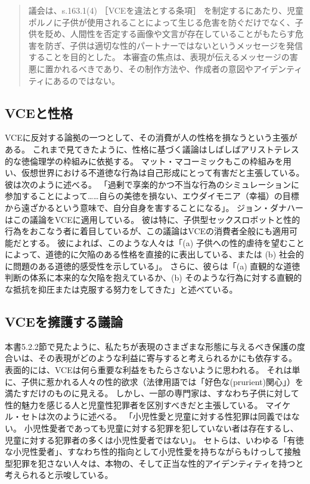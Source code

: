 \documentclass[paper=a4,book,openany]{jlreq} \usepackage{mystyle}
\begin{document}
\begin{quote}
議会は、s.163.1(4) ［VCEを違法とする条項］ を制定するにあたり、児童ポルノに子供が使用されることによって生じる危害を防ぐだけでなく、子供を貶め、人間性を否定する画像や文言が存在していることがもたらす危害を防ぎ、子供は適切な性的パートナーではないというメッセージを発信することを目的とした。
本審査の焦点は、表現が伝えるメッセージの害悪に置かれるべきであり、その制作方法や、作成者の意図やアイデンティティにあるのではない。
\end{quote}

\subsection{VCEと性格}

VCEに反対する論拠の一つとして、その消費が人の性格を損なうという主張がある。
これまで見てきたように、性格に基づく議論はしばしばアリストテレス的な徳倫理学の枠組みに依拠する。
マット・マコーミックもこの枠組みを用い、仮想世界における不道徳な行為は自己形成にとって有害だと主張している。
彼は次のように述べる。
「過剰で享楽的かつ不当な行為のシミュレーションに参加することによって……自らの美徳を損ない、エウダイモニア（幸福）の目標から遠ざかるという意味で、自分自身を害することになる」\citep[p.278]{mccormick01:_is_it_wrong_play_violen_video_games}。
ジョン・ダナハーはこの議論をVCEに適用している。
彼は特に、子供型セックスロボットと性的行為をおこなう者に着目しているが、この議論はVCEの消費者全般にも適用可能だとする。
彼によれば、このような人々は「(a) 子供への性的虐待を望むことによって、道徳的に欠陥のある性格を直接的に表出している、または (b) 社会的に問題のある道徳的感受性を示している」。
さらに、彼らは「(a) 直観的な道徳判断の体系に本来的な欠陥を抱えているか、(b) そのような行為に対する直観的な抵抗を抑圧または克服する努力をしてきた」と述べている\citep[p.86]{danaher17:_robot_rape_robot_child_sexual_abuse}。

\subsection{VCEを擁護する議論}

本書5.2.2節で見たように、私たちが表現のさまざまな形態に与えるべき保護の度合いは、その表現がどのような利益に寄与すると考えられるかにも依存する。
表面的には、VCEは何ら重要な利益をもたらさないように思われる。
それは単に、子供に惹かれる人々の性的欲求（法律用語では「好色な(prurient)関心」）を満たすだけのものに見える。
しかし、一部の専門家は、すなわち子供に対して性的魅力を感じる人{\DDASH}と児童性犯罪者を区別すべきだと主張している。
マイケル・セトは次のように述べる。
「小児性愛と児童に対する性犯罪は同義ではない。
小児性愛者であっても児童に対する犯罪を犯していない者は存在するし、児童に対する犯罪者の多くは小児性愛者ではない」\citep{apabooks18:_michael_c}。
セトらは、いわゆる「有徳な小児性愛者」、すなわち性的指向として小児性愛を持ちながらもけっして接触型犯罪を犯さない人々は、本物の、そして正当な性的アイデンティティを持つと考えられると示唆している\citep{seto12:_is_pedop_sexual_orien}。
\end{document}
